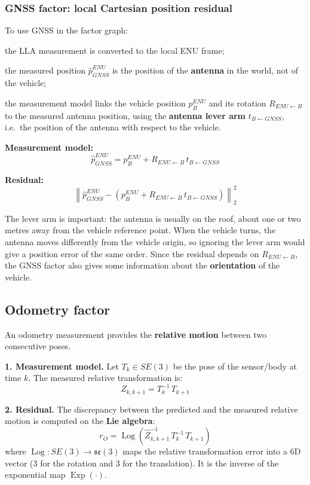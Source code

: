 \subsubsection{GNSS factor: local Cartesian position residual}
To use GNSS in the factor graph:
\begin{compactitemize}
    \item the LLA measurement is converted to the local ENU frame;
    \item the measured position $\hat p^{ENU}_{GNSS}$ is the position of the \textbf{antenna} in the world, not of the vehicle;
    \item the measurement model links the vehicle position $p^{ENU}_B$ and its rotation $R_{ENU\leftarrow B}$ to the measured antenna position, using the \textbf{antenna lever arm} $t_{B\leftarrow GNSS}$, i.e.\ the position of the antenna with respect to the vehicle.
\end{compactitemize}

\textbf{Measurement model:}
\[
\hat p^{ENU}_{GNSS} = p^{ENU}_B + R_{ENU\leftarrow B}\, t_{B\leftarrow GNSS}
\]

\textbf{Residual:}
\[
\left\| \hat p^{ENU}_{GNSS} - \left( p^{ENU}_B + R_{ENU\leftarrow B}\, t_{B\leftarrow GNSS} \right) \right\|_2^2
\]

The lever arm is important: the antenna is usually on the roof, about one or two metres away from the vehicle reference point. When the vehicle turns, the antenna moves differently from the vehicle origin, so ignoring the lever arm would give a position error of the same order. Since the residual depends on $R_{ENU\leftarrow B}$, the GNSS factor also gives some information about the \textbf{orientation} of the vehicle.

\subsection{Odometry factor}
An odometry measurement provides the \textbf{relative motion} between two consecutive poses.

\textbf{1. Measurement model.} Let $T_k \in SE(3)$ be the pose of the sensor/body at time $k$. The measured relative transformation is:
\[
Z_{k,k+1} = T_k^{-1}\, T_{k+1}
\]

\textbf{2. Residual.} The discrepancy between the predicted and the measured relative motion is computed on the \textbf{Lie algebra}:
\[
r_O = \operatorname{Log}\!\left( \hat Z_{k,k+1}^{-1}\, T_k^{-1}\, T_{k+1} \right)
\]
where $\operatorname{Log}: SE(3) \to \mathfrak{se}(3)$ maps the relative transformation error into a 6D vector (3 for the rotation and 3 for the translation). It is the inverse of the exponential map $\operatorname{Exp}(\cdot)$.

